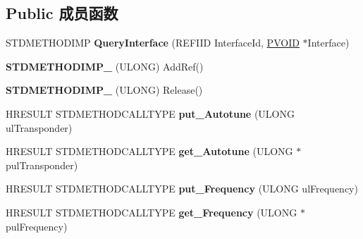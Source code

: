 \subsection*{Public 成员函数}
\begin{DoxyCompactItemize}
\item 
\mbox{\label{class_c_b_d_a_frequency_filter_a434657ab377ea67636f526c98a4da428}} 
S\+T\+D\+M\+E\+T\+H\+O\+D\+I\+MP {\bfseries Query\+Interface} (R\+E\+F\+I\+ID Interface\+Id, \hyperlink{interfacevoid}{P\+V\+O\+ID} $\ast$Interface)
\item 
\mbox{\label{class_c_b_d_a_frequency_filter_aa4770116365e3504322b86501143bda5}} 
{\bfseries S\+T\+D\+M\+E\+T\+H\+O\+D\+I\+M\+P\+\_\+} (U\+L\+O\+NG) Add\+Ref()
\item 
\mbox{\label{class_c_b_d_a_frequency_filter_adf291e09c3a650a159afeda1f7e39523}} 
{\bfseries S\+T\+D\+M\+E\+T\+H\+O\+D\+I\+M\+P\+\_\+} (U\+L\+O\+NG) Release()
\item 
\mbox{\label{class_c_b_d_a_frequency_filter_a7710ef30472eaa56c3eeec7a8cb81ee6}} 
H\+R\+E\+S\+U\+LT S\+T\+D\+M\+E\+T\+H\+O\+D\+C\+A\+L\+L\+T\+Y\+PE {\bfseries put\+\_\+\+Autotune} (U\+L\+O\+NG ul\+Transponder)
\item 
\mbox{\label{class_c_b_d_a_frequency_filter_ae873a2b717da4347ec8f309b7b036a14}} 
H\+R\+E\+S\+U\+LT S\+T\+D\+M\+E\+T\+H\+O\+D\+C\+A\+L\+L\+T\+Y\+PE {\bfseries get\+\_\+\+Autotune} (U\+L\+O\+NG $\ast$pul\+Transponder)
\item 
\mbox{\label{class_c_b_d_a_frequency_filter_ab58c646eb42e2b12f82b78508a05202e}} 
H\+R\+E\+S\+U\+LT S\+T\+D\+M\+E\+T\+H\+O\+D\+C\+A\+L\+L\+T\+Y\+PE {\bfseries put\+\_\+\+Frequency} (U\+L\+O\+NG ul\+Frequency)
\item 
\mbox{\label{class_c_b_d_a_frequency_filter_ab9ce8d966ab13b923582ab0161b845b4}} 
H\+R\+E\+S\+U\+LT S\+T\+D\+M\+E\+T\+H\+O\+D\+C\+A\+L\+L\+T\+Y\+PE {\bfseries get\+\_\+\+Frequency} (U\+L\+O\+NG $\ast$pul\+Frequency)
\item 
\mbox{\label{class_c_b_d_a_frequency_filter_a6465621e7077e07d9eb9165726ae9287}} 

\end{DoxyCompactItemize}
